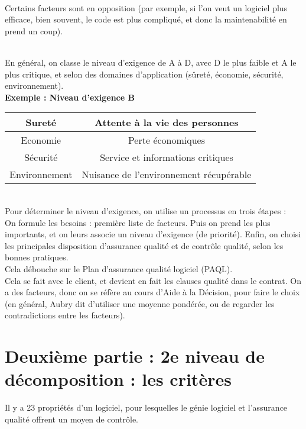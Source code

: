 \hfill\\
	 	 	 	
Certains facteurs sont en opposition (par exemple, si l'on veut un logiciel plus efficace, bien souvent, le code est plus compliqué, et donc la maintenabilité en prend un coup).

\hfill\\

En général, on classe le niveau d'exigence de A à D, avec D le plus faible et A le plus critique, et selon des domaines d'application (sûreté, économie, sécurité, environnement).\\

\textbf{Exemple : Niveau d'exigence B}

\begin{tabular}{|c|c|}
\hline
Sureté & Attente à la vie des personnes\\
\hline
Economie & Perte économiques\\
\hline
Sécurité & Service et informations critiques\\
\hline
Environnement & Nuisance de l'environnement récupérable\\
\hline
\end{tabular}

\hfill\\

Pour déterminer le niveau d'exigence, on utilise un processus en trois étapes :\\
On formule les besoins : première liste de facteurs. Puis on prend les plus importants, et on leurs associe un niveau d'exigence (de priorité). Enfin, on choisi les principales disposition d'assurance qualité et de contrôle qualité, selon les bonnes pratiques.\\
Cela débouche sur le Plan d'assurance qualité logiciel (PAQL).\\

Cela se fait avec le client, et devient en fait les clauses qualité dans le contrat. On a des facteurs, donc on se réfère au cours d'Aide à la Décision, pour faire le choix (en général, Aubry dit d'utiliser une moyenne pondérée, ou de regarder les contradictions entre les facteurs).

\section{Deuxième partie : 2e niveau de décomposition : les critères}

Il y a 23 propriétés d'un logiciel, pour lesquelles le génie logiciel et l'assurance qualité offrent un moyen de contrôle.

